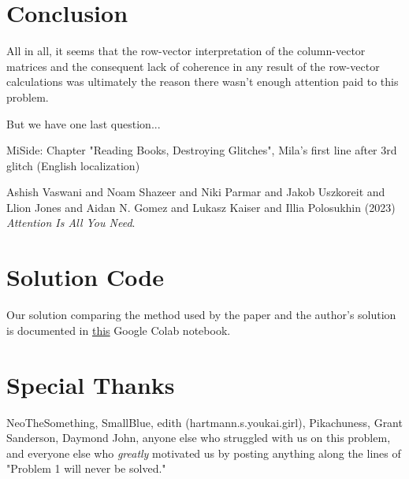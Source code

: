 \documentclass{article}
\begin{document}
\newpage



\setcounter{section}{8}
\section{Conclusion}

All in all, it seems that the row-vector interpretation of the column-vector matrices and the consequent lack of coherence in any result of the row-vector calculations was ultimately the reason there wasn't enough attention paid to this problem.

\vspace{3 cm}

But we have one last question...

\vspace{3 cm}

{
\fontsize{0}{0}\selectfont
\color{white}
MiSide: Chapter "Reading Books, Destroying Glitches", Mila's first line after 3rd glitch (English localization)
}
 

\begin{thebibliography}{9}
Ashish Vaswani and Noam Shazeer and Niki Parmar and Jakob Uszkoreit and Llion Jones and Aidan N. Gomez and Lukasz Kaiser and Illia Polosukhin (2023) \emph{Attention Is All You Need}.

\end{thebibliography}

\section{Solution Code}
Our solution comparing the method used by the paper and the author's solution is documented in \href{https://colab.research.google.com/drive/1Q0nNQ7fgpgReLvLv7iyQmWx6opQ1Zw76?authuser=1}{this} Google Colab notebook. 

\section{Special Thanks}
NeoTheSomething, SmallBlue, edith (hartmann.s.youkai.girl), Pikachuness, Grant Sanderson, Daymond John, anyone else who struggled with us on this problem, and everyone else who \emph{greatly} motivated us by posting anything along the lines of "Problem 1 will never be solved."
\end{document}
